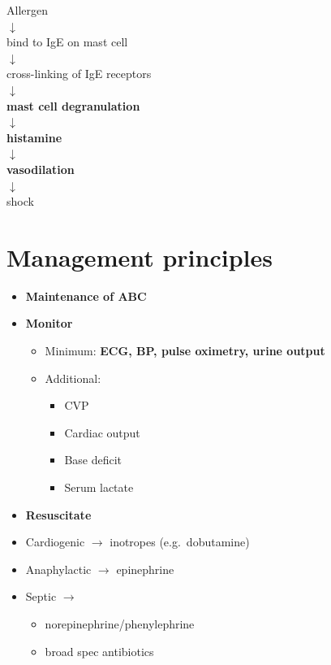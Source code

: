 \documentclass[
  14pt,
]{memoir}
\providecommand{\tightlist}{%
  \setlength{\itemsep}{0pt}\setlength{\parskip}{0pt}}
\begin{document}
\begin{center}
Allergen \\
 $\downarrow$  \\
 bind to IgE on mast cell  \\
 $\downarrow$  \\
 cross-linking of IgE receptors  \\
 $\downarrow$  \\
 \textbf{mast cell degranulation}  \\
 $\downarrow$  \\
 \textbf{histamine}  \\
 $\downarrow$  \\
 \textbf{vasodilation}\\  
 $\downarrow$  \\
 shock\\
\end{center}

\hypertarget{management-principles}{%
\section{Management principles}\label{management-principles}}

\begin{itemize}
\tightlist
\item
  \textbf{Maintenance of ABC}
\item
  \textbf{Monitor}

  \begin{itemize}
  \tightlist
  \item
    Minimum: \textbf{ECG, BP, pulse oximetry, urine output}
  \item
    Additional:

    \begin{itemize}
    \tightlist
    \item
      CVP
    \item
      Cardiac output
    \item
      Base deficit
    \item
      Serum lactate
    \end{itemize}
  \end{itemize}
\item
  \textbf{Resuscitate}
\item
  Cardiogenic \(\rightarrow\) inotropes (e.g.~dobutamine)
\item
  Anaphylactic \(\rightarrow\) epinephrine
\item
  Septic \(\rightarrow\)

  \begin{itemize}
  \tightlist
  \item
    norepinephrine/phenylephrine
  \item
    broad spec antibiotics
  \end{itemize}
\end{itemize}
\end{document}
